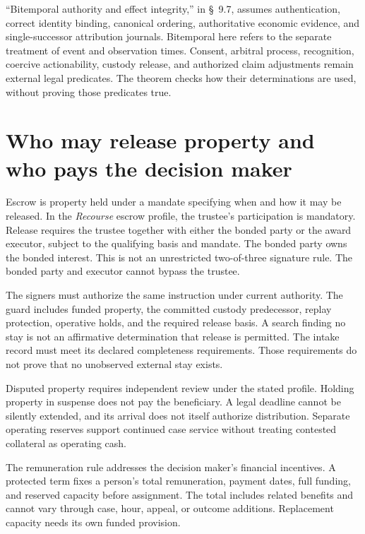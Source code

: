 \documentclass{momentum}
\begin{document}
``Bitemporal authority and effect integrity,'' in \S~9.7, assumes authentication, correct identity binding, canonical ordering, authoritative economic evidence, and single-successor attribution journals. Bitemporal here refers to the separate treatment of event and observation times. Consent, arbitral process, recognition, coercive actionability, custody release, and authorized claim adjustments remain external legal predicates. The theorem checks how their determinations are used, without proving those predicates true.

\section{Who may release property and who pays the decision maker}

Escrow is property held under a mandate specifying when and how it may be released. In the \emph{Recourse} escrow profile, the trustee's participation is mandatory. Release requires the trustee together with either the bonded party or the award executor, subject to the qualifying basis and mandate. The bonded party owns the bonded interest. This is not an unrestricted two-of-three signature rule. The bonded party and executor cannot bypass the trustee.

The signers must authorize the same instruction under current authority. The guard includes funded property, the committed custody predecessor, replay protection, operative holds, and the required release basis. A search finding no stay is not an affirmative determination that release is permitted. The intake record must meet its declared completeness requirements. Those requirements do not prove that no unobserved external stay exists.

Disputed property requires independent review under the stated profile. Holding property in suspense does not pay the beneficiary. A legal deadline cannot be silently extended, and its arrival does not itself authorize distribution. Separate operating reserves support continued case service without treating contested collateral as operating cash.

The remuneration rule addresses the decision maker's financial incentives. A protected term fixes a person's total remuneration, payment dates, full funding, and reserved capacity before assignment. The total includes related benefits and cannot vary through case, hour, appeal, or outcome additions. Replacement capacity needs its own funded provision.
\end{document}
